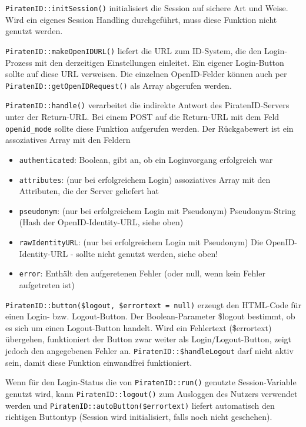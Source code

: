 \texttt{PiratenID::initSession()} initialisiert die Session auf sichere Art und Weise.
Wird ein eigenes Session Handling durchgeführt, muss diese Funktion nicht genutzt werden.

\texttt{PiratenID::makeOpenIDURL()} liefert die URL zum ID-System, die den Login-Prozess mit den derzeitigen Einstellungen einleitet.
Ein eigener Login-Button sollte auf diese URL verweisen.
Die einzelnen OpenID-Felder können auch per \texttt{PiratenID::getOpenIDRequest()} als Array abgerufen werden.

\texttt{PiratenID::handle()} verarbeitet die indirekte Antwort des PiratenID-Servers unter der Return-URL.
Bei einem POST auf die Return-URL mit dem Feld \texttt{openid\_mode} sollte diese Funktion aufgerufen werden.
Der Rückgabewert ist ein assoziatives Array mit den Feldern 
\begin{itemize}
	\item \texttt{authenticated}: Boolean, gibt an, ob ein Loginvorgang erfolgreich war
	\item \texttt{attributes}: (nur bei erfolgreichem Login) assoziatives Array mit den Attributen, die der Server geliefert hat
	\item \texttt{pseudonym}: (nur bei erfolgreichem Login mit Pseudonym) Pseudonym-String (Hash der OpenID-Identity-URL, siehe oben)
	\item \texttt{rawIdentityURL}: (nur bei erfolgreichem Login mit Pseudonym) Die OpenID-Identity-URL - sollte nicht genutzt werden, siehe oben!
	\item \texttt{error}: Enthält den aufgeretenen Fehler (oder null, wenn kein Fehler aufgetreten ist)
\end{itemize}

\texttt{PiratenID::button(\$logout, \$errortext = null)} erzeugt den HTML-Code für einen Login- bzw. Logout-Button.
Der Boolean-Parameter \$logout bestimmt, ob es sich um einen Logout-Button handelt.
Wird ein Fehlertext (\$errortext) übergehen, funktioniert der Button zwar weiter als Login/Logout-Button,
zeigt jedoch den angegebenen Fehler an.
\texttt{PiratenID::\$handleLogout} darf nicht aktiv sein, damit diese Funktion einwandfrei funktioniert.

Wenn für den Login-Status die von \texttt{PiratenID::run()} genutzte Session-Variable genutzt wird,
kann \texttt{PiratenID::logout()} zum Ausloggen des Nutzers verwendet werden und
\texttt{PiratenID::autoButton(\$errortext)} liefert automatisch den richtigen Buttontyp
(Session wird initialisiert, falls noch nicht geschehen).

